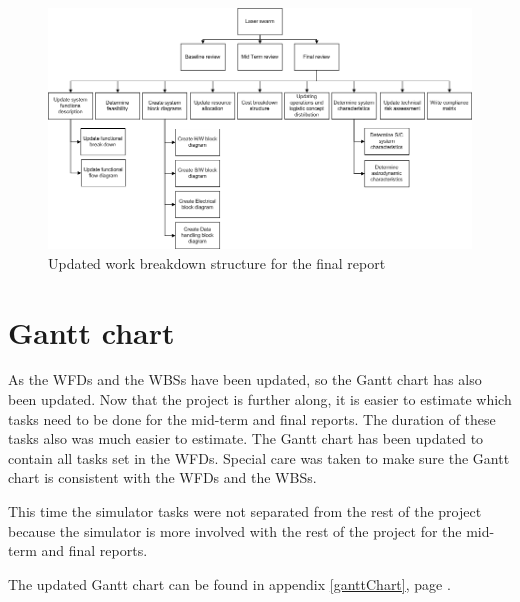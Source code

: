 \begin{figure}
\centering
\includegraphics[width=\textheight, angle=90]{chapters/img/Workbreakdown_structure_FR_v2.png}
\caption{Updated work breakdown structure for the final report}
\label{fig:WFfinal2}
\end{figure}

\section{Gantt chart}
\label{Gantt}
As the \acp{WFD} and the \acp{WBS} have been updated, so the Gantt chart has also been updated. 
Now that the project is further along, it is easier to estimate which tasks need to be done for the mid-term and final reports. The duration of these tasks also was much easier to estimate. The Gantt chart has been updated to contain all tasks set in the \ac{WFD}s. Special care was taken to make sure the Gantt chart is consistent with the \acp{WFD} and the \acp{WBS}.

This time the simulator tasks were not separated from the rest of the project because the simulator is more involved with the rest of the project for the mid-term and final reports.

The updated Gantt chart can be found in appendix \ref{ganttChart}, page \pageref{ganttChart}.